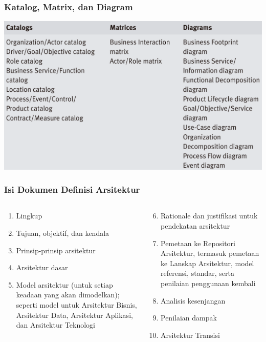 \documentclass[aspectratio=169, table]{beamer}
\begin{document}
	{
		\begin{frame}
			\centering
			\frametitle{Katalog, Matrix, dan Diagram}
			\includegraphics[width=.6\textwidth]{../figures/catalogs_matrices_diagrams.png}
		\end{frame}
	}

	\begin{frame}
		\frametitle{Isi Dokumen Definisi Arsitektur}
		\begin{columns}
			\begin{column}{0.5\textwidth}
				\begin{center}
					\begin{enumerate}
						\item Lingkup
						\item Tujuan, objektif, dan kendala
						\item Prinsip-prinsip arsitektur
						\item Arsitektur dasar
						\item Model arsitektur (untuk setiap keadaan yang akan dimodelkan); seperti model untuk Arsitektur Bisnis, Arsitektur Data, Arsitektur Aplikasi, dan Arsitektur Teknologi

					\end{enumerate}
				\end{center}
			\end{column}
			\begin{column}{0.5\textwidth}
				\begin{center}
					\begin{enumerate}
						\setcounter{enumi}{5}
						\item Rationale dan justifikasi untuk pendekatan arsitektur
						\item Pemetaan ke Repositori Arsitektur, termasuk pemetaan ke Lanskap Arsitektur, model referensi, standar, serta penilaian penggunaan kembali
						\item Analisis kesenjangan
						\item Penilaian dampak
						\item Arsitektur Transisi
					\end{enumerate}
				\end{center}
			\end{column}
		\end{columns}
	\end{frame}
\end{document}
